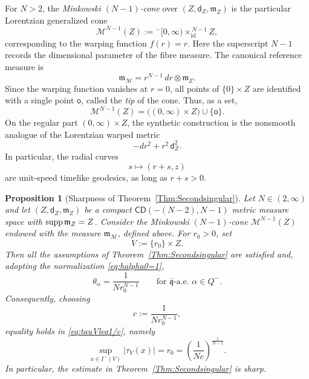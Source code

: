 \documentclass[a4paper,10pt]{article}
\newcommand{\supp}{\text{\rm supp}}
\newcommand{\CD}{\mathsf{CD}}
\newcommand{\mm}{\mathfrak m}
\newcommand{\qq}{\mathfrak q}
\newcommand{\sfd}{\mathsf d}
\theoremstyle{plain}
\newtheorem{proposition}[lemma]{Proposition}
\theoremstyle{definition}
\numberwithin{equation}{section}
\begin{document}
For $N>2$, the \emph{Minkowski $(N-1)$-cone} over
$(Z,\sfd_Z,\mm_Z)$ is the particular Lorentzian generalized cone
\begin{equation}\label{eq:Minkowski-cone-def}
    \mathcal M^{N-1}(Z)
    :=
    {}^{-}[0,\infty)\times_{\mathrm{id}}^{\,N-1} Z,
\end{equation}
corresponding to the warping function $f(r)=r$. Here the superscript
$N-1$ records the dimensional parameter of the fibre measure. The
canonical reference measure is
\begin{equation}\label{eq:Minkowski-cone-measure}
    \mm_{\mathcal M}
    =
    r^{N-1}\,dr \otimes \mm_Z.
\end{equation}
Since the warping function vanishes at $r=0$, all points of
$\{0\}\times Z$ are identified with a single point
$\mathsf o$, called the \emph{tip} of the cone. Thus, as a set,
\[
    \mathcal M^{N-1}(Z)
    =
    \bigl((0,\infty)\times Z\bigr)\cup\{\mathsf o\}.
\]
On the regular part $(0,\infty)\times Z$, the synthetic construction
is the nonsmooth analogue of the Lorentzian warped metric
\[
    -dr^2+r^2\,\sfd_Z^2.
\]
In particular, the radial curves
\[
    s\longmapsto (r+s,z)
\]
are unit-speed timelike geodesics, as long as $r+s>0$.



\begin{proposition}[Sharpness of Theorem~\ref{Thm:Secondsingular}]
\label{prop:sharpness-lorentzian-cones}
Let $N\in(2,\infty)$ and let $(Z,\sfd_Z,\mm_Z)$ be a compact $\CD(-(N-2),N-1)$ metric measure space with
$\supp\,\mm_Z=Z$.
Consider the Minkowski $(N-1)$-cone $\mathcal M^{N-1}(Z)$ endowed with the measure $\mm_{\mathcal M}$, defined above.  For $r_0>0$, set
\[
    V:=\{r_0\}\times Z.
\]
Then all the assumptions of Theorem~\ref{Thm:Secondsingular} are
satisfied and, adopting the normalization \eqref{eq:halpha0=1},
\begin{equation}\label{eq:theta-cone-sharp}
    \theta_\alpha
    =
    \frac{1}{N r_0^{N-1}}
    \qquad
    \text{for $\bar{\qq}$-a.e.\ $\alpha\in Q^-$}.
\end{equation}
Consequently, choosing
\[
    c:=\frac{1}{N r_0^{N-1}},
\]
equality holds in \eqref{eq:tauVleq1/c}, namely
\begin{equation}\label{eq:sharp-cone-equality}
    \sup_{x\in I^-(V)}|\tau_V(x)|
    =
    r_0
    =
    \left(\frac{1}{Nc}\right)^{\frac{1}{N-1}}.
\end{equation}
In particular, the estimate in
Theorem~\ref{Thm:Secondsingular} is sharp.
\end{proposition}
\end{document}
